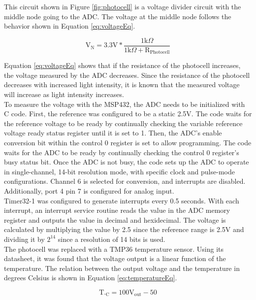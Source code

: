 \documentclass[CMPE]{KGCOEReport}
\begin{document}
This circuit shown in Figure \ref{fig:photocell} is a voltage divider circuit with the middle node going to the ADC. The voltage at the middle node follows the behavior shown in Equation \ref{eq:voltageEq}.

\begin{equation}
\text{V}_\text{N} = 3.3\text{V} * \frac{1\text{k}\Omega}{1\text{k}\Omega + \text{R}_\text{Photocell}} \label{eq:voltageEq}
\end{equation}

Equation \ref{eq:voltageEq} shows that if the resistance of the photocell increases, the voltage measured by the ADC decreases. Since the resistance of the photocell decreases with increased light intensity, it is known that the measured voltage will increase as light intensity increases.\\

To measure the voltage with the MSP432, the ADC needs to be initialized with C code. First, the reference was configured to be a static 2.5V. The code waits for the reference voltage to be ready by continually checking the variable reference voltage ready status register until it is set to 1. Then, the ADC's enable conversion bit within the control 0 register is set to allow programming. The code waits for the ADC to be ready by continually checking the control 0 register's busy status bit. Once the ADC is not busy, the code sets up the ADC to operate in single-channel, 14-bit resolution mode, with specific clock and pulse-mode configurations. Channel 6 is selected for conversion, and interrupts are disabled. Additionally, port 4 pin 7 is configured for analog input.\\

Timer32-1 was configured to generate interrupts every 0.5 seconds. With each interrupt, an interrupt service routine reads the value in the ADC memory register and outputs the value in decimal and hexidecimal. The voltage is calculated by multiplying the value by 2.5 since the reference range is 2.5V and dividing it by $2^{14}$ since a resolution of 14 bits is used. \\

The photocell was replaced with a TMP36 temperature sensor. Using its datasheet, it was found that the voltage output is a linear function of the temperature. The relation between the output voltage and the temperature in degrees Celsius is shown in Equation \ref{eq:temperatureEq}.

\begin{equation}
\text{T}_{^\circ\text{C}} = 100\text{V}_\text{out} - 50
\label{eq:temperatureEq}
\end{equation}
\end{document}

